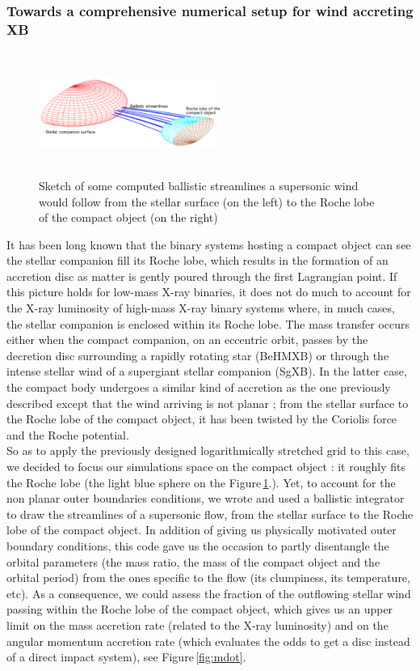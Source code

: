 \documentclass[
    a4paper, 
    12pt, onecolumn,
]{article}
\begin{document}
\subsubsection*{Towards a comprehensive numerical setup for wind accreting XB}
\begin{figure}
\includegraphics[height=4cm, width=6cm]{B1.png}
\caption{Sketch of some computed ballistic streamlines a supersonic wind would follow from the stellar surface (on the left) to the Roche lobe of the compact object (on the right)}
\label{fig:streamlines}
\end{figure} 
\indent \indent It has been long known that the binary systems hosting a compact object can see the stellar companion fill its Roche lobe, which results in the formation of an accretion disc as matter is gently poured through the first Lagrangian point. If this picture holds for low-mass X-ray binaries, it does not do much to account for the X-ray luminosity of high-mass X-ray binary systems where, in much cases, the stellar companion is enclosed within its Roche lobe. The mass transfer occurs either when the compact companion, on an eccentric orbit, passes by the decretion disc surrounding a rapidly rotating star (BeHMXB) or through the intense stellar wind of a supergiant stellar companion (SgXB). In the latter case, the compact body undergoes a similar kind of accretion as the one previously described except that the wind arriving is not planar ; from the stellar surface to the Roche lobe of the compact object, it has been twisted by the Coriolis force and the Roche potential.\\
\indent So as to apply the previously designed logarithmically stretched grid to this case, we decided to focus our simulations space on the compact object : it roughly fits the Roche lobe (the light blue sphere on the Figure\,\ref{fig:streamlines}.). Yet, to account for the non planar outer boundaries conditions, we wrote and used a ballistic integrator to draw the streamlines of a supersonic flow, from the stellar surface to the Roche lobe of the compact object. In addition of giving us physically motivated outer boundary conditions, this code gave us the occasion to partly disentangle the orbital parameters (the mass ratio, the mass of the compact object and the orbital period) from the ones specific to the flow (its clumpiness, its temperature, etc). As a consequence, we could assess the fraction of the outflowing stellar wind passing within the Roche lobe of the compact object, which gives us an upper limit on the mass accretion rate (related to the X-ray luminosity) and on the angular momentum accretion rate (which evaluates the odds to get a disc instead of a direct impact system), see Figure\,\ref{fig:mdot}.
\end{document}
